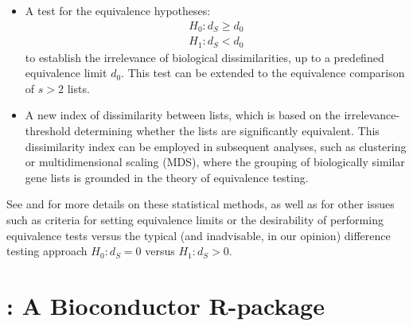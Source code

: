 \begin{itemize}
\item
  A test for the equivalence hypotheses:
  \begin{equation*}
  \begin{split}
  H_0: d_S \ge d_0 \\
  H_1: d_S < d_0
  \end{split}
  \end{equation*}
  to establish the irrelevance of biological dissimilarities, up to a predefined equivalence limit \(d_0\). This test can be extended to the equivalence comparison of \(s > 2\) lists.
\item
  A new index of dissimilarity between lists, which is based on the irrelevance-threshold determining whether the lists are significantly equivalent. This dissimilarity index can be employed in subsequent analyses, such as clustering or multidimensional scaling (MDS), where the grouping of biologically similar gene lists is grounded in the theory of equivalence testing.
\end{itemize}

See \citep{flores2022equivalence} and \citep{phdThesisPabloFlores} for more details on these statistical methods, as well as for other issues such as criteria for setting equivalence limits or the desirability of performing equivalence tests \citep{wellek2002testing} versus the typical (and inadvisable, in our opinion) difference testing approach \(H_0: d_S=0\) versus \(H_1:d_S>0\).

\hypertarget{a-bioconductor-r-package}{%
\section{\texorpdfstring{: A Bioconductor R-package}{: A Bioconductor R-package}}\label{a-bioconductor-r-package}}

